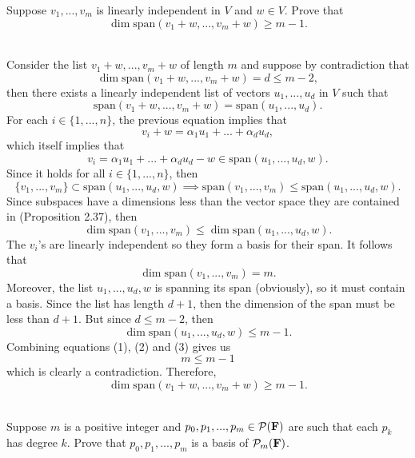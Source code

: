 \begin{exercise}
    Suppose $v_1, ..., v_m$ is linearly independent in $V$ and $w \in V$. Prove that
    $$\dim \text{span}(v_1 + w, ..., v_m + w) \geq m-1.$$
\end{exercise}

\begin{solution}
    \\ Consider the list $v_1 + w, ..., v_m + w$ of length $m$ and suppose by contradiction that
    $$\dim \text{span}(v_1 + w, ..., v_m + w) = d \leq m-2,$$
    then there exists a linearly independent list of vectors $u_1, ..., u_d$ in $V$ such that
    $$\text{span}(v_1 + w, ..., v_m + w) = \text{span}(u_1, ..., u_d).$$
    For each $i \in \{1, ..., n\}$, the previous equation implies that
    $$v_i + w = \alpha_1 u_1 + ... + \alpha_d u_d,$$
    which itself implies that
    $$v_i = \alpha_1 u_1 + ... + \alpha_d u_d - w \in \text{span}(u_1, ..., u_d, w).$$
    Since it holds for all $i \in \{1, ..., n\}$, then
    $$\{v_1, ..., v_m\} \subset \text{span}(u_1, ..., u_d, w) \implies \text{span}(v_1, ..., v_m) \leq \text{span}(u_1, ..., u_d, w).$$
    Since subspaces have a dimensions less than the vector space they are contained in (Proposition 2.37), then
    \[ \dim \text{span}(v_1, ..., v_m) \leq \dim \text{span}(u_1, ..., u_d, w). \tag*{(1)} \]
    The $v_i$'s are linearly independent so they form a basis for their span. It follows that
    \[\dim \text{span}(v_1, ..., v_m) = m. \tag*{(2)} \]
    Moreover, the list $u_1, ..., u_d, w$ is spanning its span (obviously), so it must contain a basis. Since the list has length $d+1$, then the dimension of the span must be less than $d+1$. But since $d \leq m-2$, then
    \[\dim \text{span}(u_1, ..., u_d, w) \leq m-1. \tag*{(3)} \]
    Combining equations (1), (2) and (3) gives us
    $$m \leq m-1$$
    which is clearly a contradiction. Therefore,
    $$\dim \text{span}(v_1 + w, ..., v_m + w) \geq m-1.$$\\
\end{solution}

\begin{exercise}
    Suppose $m$ is a positive integer and $p_0, p_1, ..., p_m \in \mathcal{P}(\mathbf{F})$ are such that each $p_k$ has degree $k$. Prove that $p_0, p_1, ..., p_m$ is a basis of $\mathcal{P}_m(\mathbf{F})$.\\
\end{exercise}


